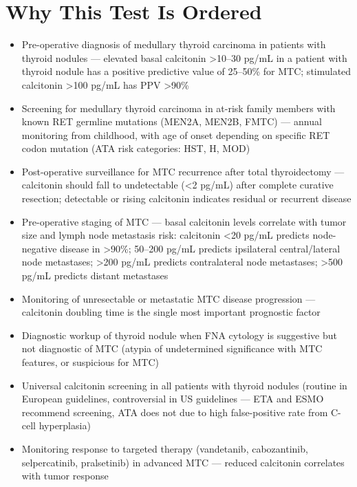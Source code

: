 \section*{Why This Test Is Ordered}
\begin{itemize}
  \item Pre-operative diagnosis of medullary thyroid carcinoma in patients with thyroid nodules --- elevated basal calcitonin >10--30 pg/mL in a patient with thyroid nodule has a positive predictive value of 25--50\% for MTC; stimulated calcitonin >100 pg/mL has PPV >90\%
  \item Screening for medullary thyroid carcinoma in at-risk family members with known RET germline mutations (MEN2A, MEN2B, FMTC) --- annual monitoring from childhood, with age of onset depending on specific RET codon mutation (ATA risk categories: HST, H, MOD)
  \item Post-operative surveillance for MTC recurrence after total thyroidectomy --- calcitonin should fall to undetectable (<2 pg/mL) after complete curative resection; detectable or rising calcitonin indicates residual or recurrent disease
  \item Pre-operative staging of MTC --- basal calcitonin levels correlate with tumor size and lymph node metastasis risk: calcitonin <20 pg/mL predicts node-negative disease in >90\%; 50--200 pg/mL predicts ipsilateral central/lateral node metastases; >200 pg/mL predicts contralateral node metastases; >500 pg/mL predicts distant metastases
  \item Monitoring of unresectable or metastatic MTC disease progression --- calcitonin doubling time is the single most important prognostic factor
  \item Diagnostic workup of thyroid nodule when FNA cytology is suggestive but not diagnostic of MTC (atypia of undetermined significance with MTC features, or suspicious for MTC)
  \item Universal calcitonin screening in all patients with thyroid nodules (routine in European guidelines, controversial in US guidelines --- ETA and ESMO recommend screening, ATA does not due to high false-positive rate from C-cell hyperplasia)
  \item Monitoring response to targeted therapy (vandetanib, cabozantinib, selpercatinib, pralsetinib) in advanced MTC --- reduced calcitonin correlates with tumor response
\end{itemize}

